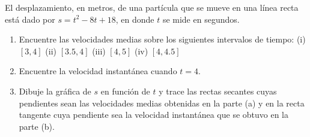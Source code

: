 \item El desplazamiento, en metros, de una partícula que se mueve en una línea recta está dado por $s = t^2 - 8t + 18$, en donde $t$ se mide en segundos.
    \begin{enumerate}
        \item Encuentre las velocidades medias sobre los siguientes intervalos de tiempo:
        (i) $[3, 4]$ \quad (ii) $[3.5, 4]$ \quad (iii) $[4, 5]$ \quad (iv) $[4, 4.5]$
        \item Encuentre la velocidad instantánea cuando $t = 4$.
        \item Dibuje la gráfica de $s$ en función de $t$ y trace las rectas secantes cuyas pendientes sean las velocidades medias obtenidas en la parte (a) y en la recta tangente cuya pendiente sea la velocidad instantánea que se obtuvo en la parte (b).
    \end{enumerate}
